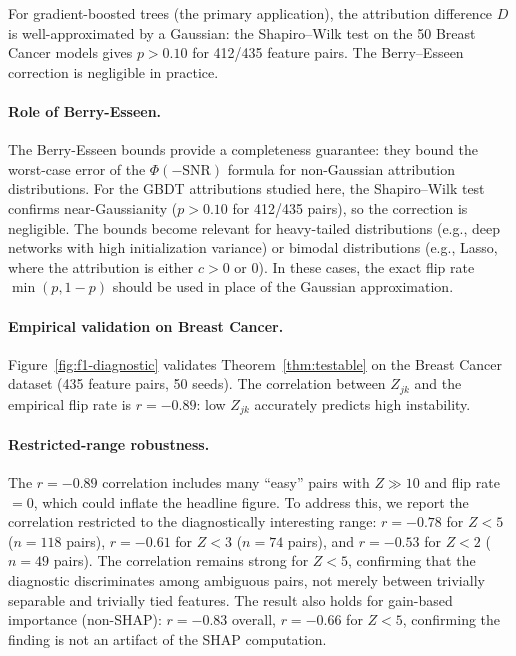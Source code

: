\documentclass{article}
\begin{document}
For gradient-boosted trees (the primary application), the
attribution difference $D$ is well-approximated by a Gaussian:
the Shapiro--Wilk test on the 50 Breast Cancer models gives
$p > 0.10$ for 412/435 feature pairs. The Berry--Esseen correction
is negligible in practice.

\paragraph{Role of Berry-Esseen.}
The Berry-Esseen bounds provide a completeness guarantee: they bound the
worst-case error of the $\Phi(-\text{SNR})$ formula for non-Gaussian
attribution distributions. For the GBDT attributions studied here, the
Shapiro--Wilk test confirms near-Gaussianity ($p > 0.10$ for 412/435
pairs), so the correction is negligible. The bounds become relevant for
heavy-tailed distributions (e.g., deep networks with high initialization
variance) or bimodal distributions (e.g., Lasso, where the attribution is
either $c > 0$ or $0$). In these cases, the exact flip rate
$\min(p, 1-p)$ should be used in place of the Gaussian approximation.

\paragraph{Empirical validation on Breast Cancer.}
Figure~\ref{fig:f1-diagnostic} validates Theorem~\ref{thm:testable}
on the Breast Cancer dataset (435 feature pairs, 50 seeds).
The correlation between $Z_{jk}$ and the empirical flip rate is
$r = -0.89$: low $Z_{jk}$ accurately predicts high instability.

\paragraph{Restricted-range robustness.}
The $r = -0.89$ correlation includes many ``easy'' pairs with
$Z \gg 10$ and flip rate~$= 0$, which could inflate the headline
figure.
To address this, we report the correlation restricted to the
diagnostically interesting range:
$r = -0.78$ for $Z < 5$ ($n = 118$ pairs),
$r = -0.61$ for $Z < 3$ ($n = 74$ pairs), and
$r = -0.53$ for $Z < 2$ ($n = 49$ pairs).
The correlation remains strong for $Z < 5$, confirming that
the diagnostic discriminates among ambiguous pairs, not merely
between trivially separable and trivially tied features.
The result also holds for gain-based importance (non-SHAP):
$r = -0.83$ overall, $r = -0.66$ for $Z < 5$, confirming the
finding is not an artifact of the SHAP computation.
\end{document}
